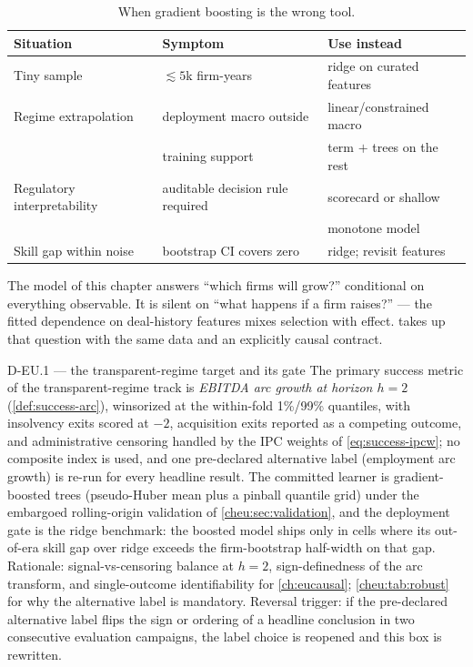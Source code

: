 \begin{table}[htbp]
\centering
\caption{When gradient boosting is the wrong tool.}
\label{cheu:tab:notxgb}
\begin{tabular}{@{}lll@{}}
\toprule
Situation & Symptom & Use instead \\
\midrule
Tiny sample & $\lesssim 5$k firm-years & ridge on curated features \\
Regime extrapolation & deployment macro outside & linear/constrained
macro \\
 & training support & term $+$ trees on the rest \\
Regulatory interpretability & auditable decision rule required &
scorecard or shallow \\
 & & monotone model \\
Skill gap within noise & bootstrap CI covers zero & ridge; revisit
features \\
\bottomrule
\end{tabular}
\end{table}

The model of this chapter answers ``which firms will grow?'' conditional on everything
observable. It is silent on ``what happens if a firm raises?'' --- the fitted dependence on
deal-history features mixes selection with effect.  takes up that question
with the same data and an explicitly causal contract.

\begin{decision}{D-EU.1 --- the transparent-regime target and its gate}
The primary success metric of the transparent-regime track is \emph{EBITDA arc growth at horizon
$h=2$} (\cref{def:success-arc}), winsorized at the within-fold 1\%/99\% quantiles, with
insolvency exits scored at $-2$, acquisition exits reported as a competing outcome, and
administrative censoring handled by the IPC weights of \cref{eq:success-ipcw}; no composite
index is used, and one pre-declared alternative label (employment arc growth) is re-run for
every headline result. The committed learner is gradient-boosted trees (pseudo-Huber mean plus a
pinball quantile grid) under the embargoed rolling-origin validation of
\cref{cheu:sec:validation}, and the deployment gate is the ridge benchmark: the boosted model
ships only in cells where its out-of-era skill gap over ridge exceeds the firm-bootstrap
half-width on that gap. Rationale: signal-vs-censoring balance at $h=2$, sign-definedness of the
arc transform, and single-outcome identifiability for \cref{ch:eucausal}; \cref{cheu:tab:robust}
for why the alternative label is mandatory. Reversal trigger: if the pre-declared alternative
label flips the sign or ordering of a headline conclusion in two consecutive evaluation
campaigns, the label choice is reopened and this box is rewritten.
\end{decision}

